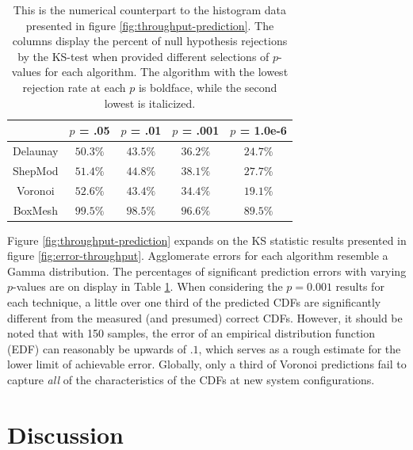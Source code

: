 \documentclass[smallextended,final]{svjour3}       %
\begin{document}
\begin{table}
  \renewcommand{\arraystretch}{1.3}
  \centering
  \begin{tabular}{c|c|c|c|c}
     & $p$ = .05 & $p$ = .01 & $p$ = .001 & $p$ = 1.0e-6\\
    \hline
    Delaunay & $\mathbf{50.3}\%$ & $\mathit{43.5}\%$ & $\mathit{36.2}\%$ & $\mathit{24.7}\%$\\
    ShepMod & $\mathit{51.4}\%$ & $44.8\%$ & $38.1\%$ & $27.7\%$\\
    Voronoi & $52.6\%$ & $\mathbf{43.4}\%$ & $\mathbf{34.4}\%$ & $\mathbf{19.1}\%$\\
    BoxMesh & $99.5\%$ & $98.5\%$ & $96.6\%$ & $89.5\%$\\
  \end{tabular}
  \caption{This is the numerical counterpart to the histogram data presented in figure \ref{fig:throughput-prediction}. The columns display the percent of null hypothesis rejections by the KS-test when provided different selections of $p$-values for each algorithm. The algorithm with the lowest rejection rate at each $p$ is boldface, while the second lowest is italicized.}
  \label{table:null-hypothesis-results}
\end{table}



Figure \ref{fig:throughput-prediction} expands on the KS statistic results presented in figure \ref{fig:error-throughput}. Agglomerate errors for each algorithm resemble a Gamma distribution. The percentages of significant prediction errors with varying $p$-values are on display in Table \ref{table:null-hypothesis-results}. When considering the $p=0.001$ results for each technique, a little over one third of the predicted CDFs are significantly different from the measured (and presumed) correct CDFs. However, it should be noted that with 150 samples, the error of an empirical distribution function (EDF) can reasonably be upwards of $.1$, which serves as a rough estimate for the lower limit of achievable error. Globally, only a third of Voronoi predictions fail to capture \textit{all} of the characteristics of the CDFs at new system configurations.

\section{Discussion}
\label{sec:discussion}
\end{document}
